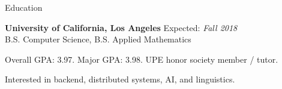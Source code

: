 \documentclass{resume} %
\begin{document}

\begin{rSection}{Education}

{\bf University of California, Los Angeles} \hfill {Expected: \em Fall 2018} \\ 
B.S. Computer Science, B.S. Applied Mathematics
\begin{rSubsection}{}{}{}{}
\item Overall GPA: 3.97. Major GPA: 3.98. UPE honor society member / tutor. 
\item Interested in backend, distributed systems, AI, and linguistics.
\end{rSubsection}

\end{rSection}

\end{document}
